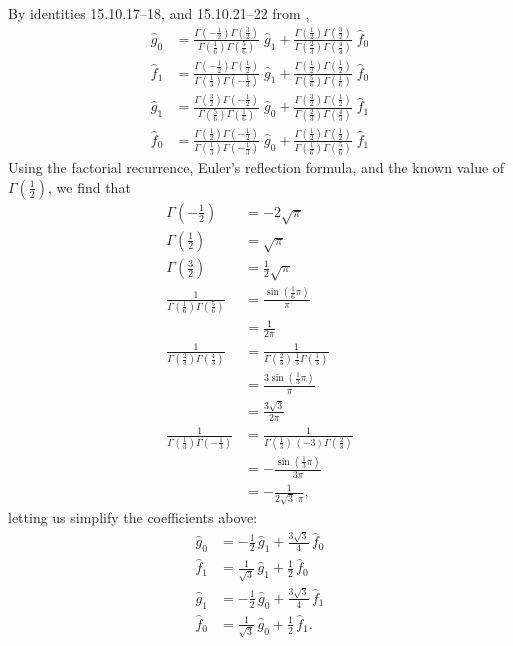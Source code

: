 \documentclass{article}
\theoremstyle{definition}
\theoremstyle{plain}
\begin{document}
By identities 15.10.17--18, and 15.10.21--22 from \cite{dlmf},
\begin{align*}
\hat{g}_0 & = \frac{\Gamma(-\tfrac{1}{2}) \Gamma(\tfrac{3}{2})}{\Gamma(\tfrac{1}{6}) \Gamma(\tfrac{5}{6})}\;\hat{g}_1 + \frac{\Gamma(\tfrac{1}{2}) \Gamma(\tfrac{3}{2})}{\Gamma(\tfrac{2}{3}) \Gamma(\tfrac{4}{3})}\;\hat{f}_0 \\
\hat{f}_1 & = \frac{\Gamma(-\tfrac{1}{2}) \Gamma(\tfrac{1}{2})}{\Gamma(\tfrac{1}{3}) \Gamma(-\tfrac{1}{3})}\;\hat{g}_1 + \frac{\Gamma(\tfrac{1}{2}) \Gamma(\tfrac{1}{2})}{\Gamma(\tfrac{5}{6}) \Gamma(\tfrac{1}{6})}\;\hat{f}_0 \\
\hat{g}_1 & = \frac{\Gamma(\tfrac{3}{2}) \Gamma(-\tfrac{1}{2})}{\Gamma(\tfrac{5}{6}) \Gamma(\tfrac{1}{6})}\;\hat{g}_0 + \frac{\Gamma(\tfrac{3}{2}) \Gamma(\tfrac{1}{2})}{\Gamma(\tfrac{2}{3}) \Gamma(\tfrac{4}{3})}\;\hat{f}_1 \\
\hat{f}_0 & = \frac{\Gamma(\tfrac{1}{2}) \Gamma(-\tfrac{1}{2})}{\Gamma(\tfrac{1}{3}) \Gamma(-\tfrac{1}{3})}\;\hat{g}_0 + \frac{\Gamma(\tfrac{1}{2}) \Gamma(\tfrac{1}{2})}{\Gamma(\tfrac{1}{6}) \Gamma(\tfrac{5}{6})}\;\hat{f}_1
\end{align*}
Using the factorial recurrence, Euler's reflection formula, and the known value of $\Gamma(\tfrac{1}{2})$, we find that
\begin{align*}
\Gamma(-\tfrac{1}{2}) & = -2\sqrt{\pi} \\
\Gamma(\tfrac{1}{2}) & = \sqrt{\pi} \\
\Gamma(\tfrac{3}{2}) & = \tfrac{1}{2}\sqrt{\pi} \\
\frac{1}{\Gamma(\tfrac{1}{6}) \Gamma(\tfrac{5}{6})} & = \frac{\sin(\tfrac{1}{6} \pi)}{\pi} \\
& = \frac{1}{2\pi} \\
\frac{1}{\Gamma(\tfrac{2}{3}) \Gamma(\tfrac{4}{3})} & = \frac{1}{\Gamma(\tfrac{2}{3})\,\tfrac{1}{3} \Gamma(\tfrac{1}{3})} \\
& = \frac{3 \sin(\tfrac{1}{3} \pi)}{\pi} \\
& = \frac{3\sqrt{3}}{2\pi} \\
\frac{1}{\Gamma(\tfrac{1}{3}) \Gamma(-\tfrac{1}{3})} & = \frac{1}{\Gamma(\tfrac{1}{3})\,(-3)\Gamma(\tfrac{2}{3})} \\
& = -\frac{\sin(\tfrac{1}{3} \pi)}{3\pi} \\
& = -\frac{1}{2\sqrt{3}\;\pi},
\end{align*}
letting us simplify the coefficients above:
\begin{align*}
\hat{g}_0 & = -\tfrac{1}{2}\,\hat{g}_1 + \tfrac{3\sqrt{3}}{4}\,\hat{f}_0 \\
\hat{f}_1 & = \tfrac{1}{\sqrt{3}}\,\hat{g}_1 + \tfrac{1}{2}\,\hat{f}_0 \\
\hat{g}_1 & = -\tfrac{1}{2}\,\hat{g}_0 + \tfrac{3\sqrt{3}}{4}\,\hat{f}_1 \\
\hat{f}_0 & = \tfrac{1}{\sqrt{3}}\,\hat{g}_0 + \tfrac{1}{2}\,\hat{f}_1.
\end{align*}
\end{document}

